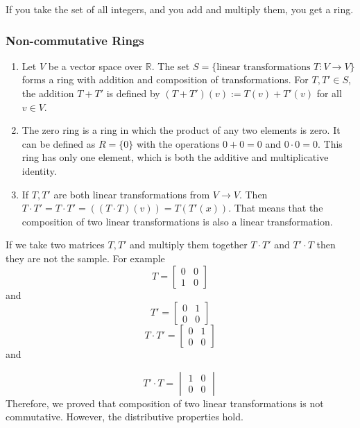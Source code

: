 \documentclass[11pt]{article}
\begin{document}
\begin{fact}
    If you take the set of all integers, and you add and multiply them, you get a ring.
\end{fact}

\subsubsection{Non-commutative Rings}
\begin{enumerate}
    \item Let \(V\) be a vector space over \(\mathbb{R}\). The set \(S = \{\text{linear
              transformations } T: V \to V\}\) forms a ring with addition and composition of
          transformations. For \(T, T' \in S\), the addition \(T + T'\) is defined by
          \((T + T')(v) := T(v) + T'(v)\) for all \(v \in V\).
    \item The zero ring is a ring in which the product of any two elements is zero. It
          can be defined as \( R = \{0\} \) with the operations \( 0 + 0 = 0 \) and \( 0
          \cdot 0 = 0 \). This ring has only one element, which is both the additive and
          multiplicative identity.
    \item If \(T, T'\) are both linear transformations from \(V \rightarrow V\). Then \(T \cdot T' = T \cdot T' = \left((T \cdot T)(v)  \right) = T(T'(x))\). That means that the composition of two linear transformations is also a linear transformation. 
\end{enumerate}
\begin{fact}
    If we take two matrices \(T, T'\) and multiply them together \(T \cdot T'\) and \(T' \cdot T\) then they are not the sample. For example
    \[T = \begin{bmatrix}
        0 & 0 \\    
1 & 0
    \end{bmatrix}\] and 
    \[T'=\begin{bmatrix}
        0 & 1 \\
        0 & 0
    \end{bmatrix}\]
    \[T \cdot T' = \begin{bmatrix}
        0 & 1 \\
        0 & 0
    \end{bmatrix}\] and

    \[T' \cdot T = \begin{vmatrix}
    1 & 0 \\
    0 & 0
    \end{vmatrix}\]
    Therefore, we proved that composition of two linear transformations is not commutative.
However, the distributive properties hold.
\end{fact}
\end{document}
